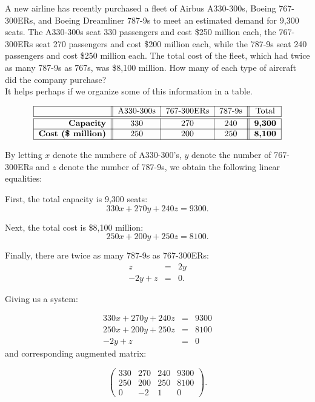 \begin{example}
A new airline has recently purchased a fleet of Airbus A330-300s, Boeing 767-300ERs, and Boeing Dreamliner 787-9s to meet an estimated demand for 9,300 seats. The A330-300s seat 330 passengers and cost \$250 million each, the 767-300ERs seat 270 passengers and cost \$200 million each, while the 787-9s seat 240 passengers and cost \$250 million each. The total cost of the fleet, which had twice as many 787-9s as 767s, was \$8,100 million. How many of each type of aircraft did the company purchase?\\

It helps perhaps if we organize some of this information in a table.

$$\begin{tabular}{|r||c|c|c||c|}
\hline
& A330-300s &  767-300ERs & 787-9s & Total\\
\hline
\hline
\textbf{Capacity} & 330 & 270 & 240 & \textbf{9,300}\\
\hline
\textbf{Cost (\$ million)} & 250 & 200 & 250 & \textbf{8,100}\\
\hline
\end{tabular}
$$

By letting $x$ denote the numbere of A330-300's, $y$ denote the number of 767-300ERs and $z$ denote the number of 787-9s, we obtain the following linear equalities:

First, the total capacity is 9,300 seats: $$330x+270y+240z=9300.$$

Next, the total cost is \$8,100 million: $$250x+200y+250z=8100.$$

Finally, there are twice as many 787-9s as 767-300ERs: %
\begin{eqnarray*}
z&=&2y\\
-2y+z&=&0.
\end{eqnarray*}

Giving us a system:

\begin{eqnarray*}
330x+270y+240z&=&9300\\
250x+200y+250z&=&8100\\
-2y+z&=&0
\end{eqnarray*}
and corresponding augmented matrix:

$$ \left( \begin{array}{rrr|r}
330 & 270 & 240& 9300\\
250 & 200 & 250 & 8100\\
0 & -2 & 1 & 0
\end{array}\right).$$


\end{example}
